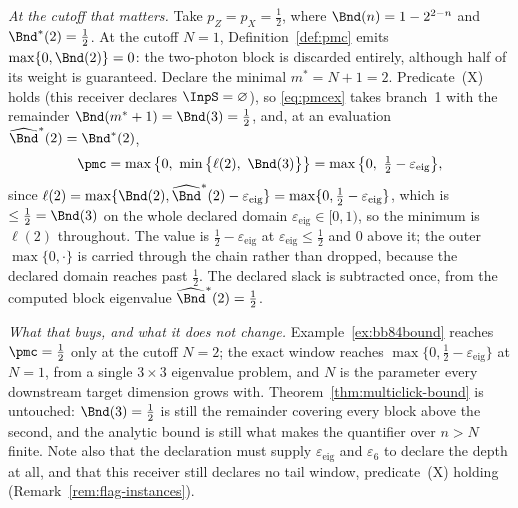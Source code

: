\begin{example}
\emph{At the cutoff that matters.} Take $p_Z=p_X=\tfrac12$, where
$\Bnd(n)=1-2^{2-n}$ and $\Bnd^{\ast}(2)=\tfrac12$. At the cutoff $N=1$,
Definition~\ref{def:pmc} emits $\max\{0,\Bnd(2)\}=0$: the two-photon block is
discarded entirely, although half of its weight is guaranteed. Declare the
minimal  $m^{\ast}=N+1=2$. Predicate~(X) holds (this receiver declares
$\InpS=\varnothing$), so \eqref{eq:pmcex} takes branch~1 with the remainder
$\Bnd(m^{\ast}+1)=\Bnd(3)=\tfrac12$, and, at an evaluation
$\widehat\Bnd^{\ast}(2)=\Bnd^{\ast}(2)$,
\begin{equation}\label{eq:bb84exactemit}
  \pmc=\max\big\{0,\ \min\big\{\ell(2),\ \Bnd(3)\big\}\big\}
   =\max\big\{0,\ \tfrac12-\varepsilon_{\mathrm{eig}}\big\} ,
\end{equation}
since $\ell(2)=\max\{\Bnd(2),\widehat\Bnd^{\ast}(2)
-\varepsilon_{\mathrm{eig}}\}=\max\{0,\tfrac12-\varepsilon_{\mathrm{eig}}\}$,
which is $\le\tfrac12=\Bnd(3)$ on the whole declared domain
$\varepsilon_{\mathrm{eig}}\in[0,1)$, so the minimum is $\ell(2)$ throughout.
The value is $\tfrac12-\varepsilon_{\mathrm{eig}}$ at
$\varepsilon_{\mathrm{eig}}\le\tfrac12$ and $0$ above it; the outer
$\max\{0,\cdot\}$ is carried through the chain rather than dropped, because
the declared domain reaches past $\tfrac12$.
The declared slack is subtracted once, from the computed block eigenvalue
$\widehat\Bnd^{\ast}(2)=\tfrac12$.

\emph{What that buys, and what it does not change.}
Example~\ref{ex:bb84bound} reaches $\pmc=\tfrac12$ only at the cutoff $N=2$;
the exact window reaches $\max\{0,\tfrac12-\varepsilon_{\mathrm{eig}}\}$ at
$N=1$, from a single $3\times3$ eigenvalue
problem, and $N$ is the parameter every downstream target dimension grows with.
Theorem~\ref{thm:multiclick-bound} is untouched: $\Bnd(3)=\tfrac12$ is still
the remainder covering every block above the second, and the analytic bound is
still what makes the quantifier over $n>N$ finite. Note also that the
declaration must supply $\varepsilon_{\mathrm{eig}}$ and $\varepsilon_6$ to
declare the depth at all, and that this receiver still declares no tail
window, predicate~(X) holding
(Remark~\ref{rem:flag-instances}).
\end{example}

